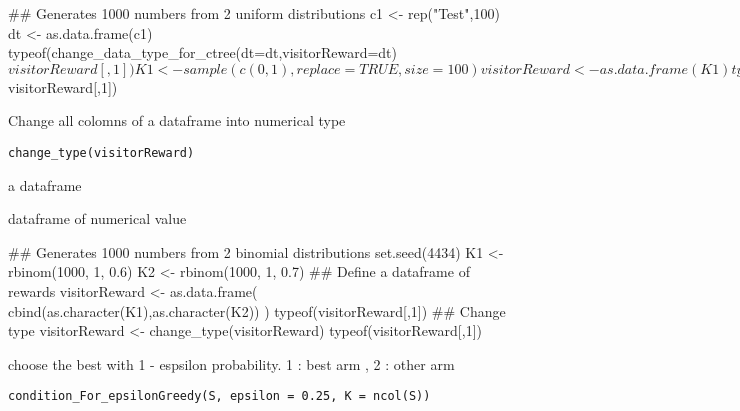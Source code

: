\documentclass[letterpaper]{book}
\begin{document}
%
\begin{Examples}
\begin{ExampleCode}
## Generates 1000 numbers from 2 uniform distributions
c1 <- rep("Test",100)
dt <- as.data.frame(c1)
typeof(change_data_type_for_ctree(dt=dt,visitorReward=dt)$visitorReward[,1])
K1 <- sample(c(0,1),replace=TRUE,size= 100)
visitorReward <- as.data.frame(K1)
typeof(change_data_type_for_ctree(dt=dt,visitorReward=dt,is_reward_are_boolean=FALSE)$visitorReward[,1])
\end{ExampleCode}
\end{Examples}
%
\begin{Description}\relax
Change all colomns of a dataframe into
numerical type
\end{Description}
%
\begin{Usage}
\begin{verbatim}
change_type(visitorReward)
\end{verbatim}
\end{Usage}
%
\begin{Arguments}
\begin{ldescription}
\item[\code{visitorReward}] a dataframe
\end{ldescription}
\end{Arguments}
%
\begin{Value}
dataframe of numerical value
\end{Value}
%
\begin{Examples}
\begin{ExampleCode}
## Generates 1000 numbers from 2 binomial distributions
set.seed(4434)
K1 <- rbinom(1000, 1, 0.6)
K2 <- rbinom(1000, 1, 0.7)
## Define a dataframe of rewards
visitorReward <- as.data.frame( cbind(as.character(K1),as.character(K2)) )
typeof(visitorReward[,1])
## Change type
visitorReward <- change_type(visitorReward)
typeof(visitorReward[,1])
\end{ExampleCode}
\end{Examples}
%
\begin{Description}\relax
choose the best with 1 - espsilon probability. 1 : best arm , 2 : other arm
\end{Description}
%
\begin{Usage}
\begin{verbatim}
condition_For_epsilonGreedy(S, epsilon = 0.25, K = ncol(S))
\end{verbatim}
\end{Usage}
\end{document}
